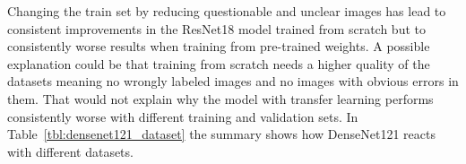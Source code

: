 \begin{table}[!h] \centering
{}
\caption{Dataset variations with ResNet18. The first column shows how the datasets performed when trained from scratch whereas the second column shows how the datasets performed with pre-training.}
\label{tbl:resnet18_dataset}
\end{table}

\quad

Changing the train set by reducing questionable and unclear images has lead to consistent improvements in the ResNet18 model trained from scratch but to consistently worse results when training from pre-trained weights. A possible explanation could be that training from scratch needs a higher quality of the datasets meaning no wrongly labeled images and no images with obvious errors in them. That would not explain why the model with transfer learning performs consistently worse with different training and validation sets. In Table~\ref{tbl:densenet121_dataset} the summary shows how DenseNet121 reacts with different datasets. \\



